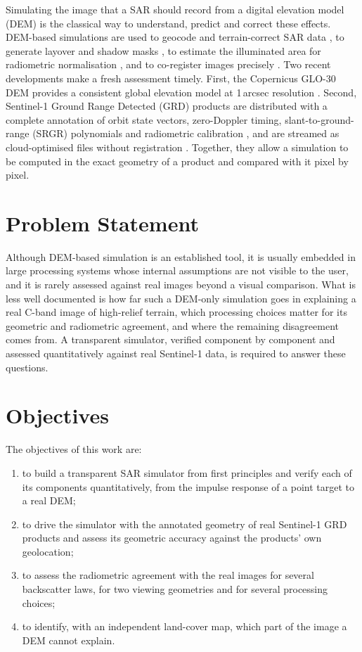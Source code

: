 Simulating the image that a SAR should record from a digital elevation model (DEM) is the classical way to understand,
predict and correct these effects. DEM-based simulations are used to geocode and terrain-correct SAR data
\cite{schreier1993,meier1993,small2011,low2007}, to generate layover and shadow masks \cite{kropatsch1990}, to estimate
the illuminated area for radiometric normalisation \cite{ulander1996,small2011,frey2013}, and to co-register images
precisely \cite{nitti2011}. Two recent developments make a fresh assessment timely. First, the Copernicus GLO-30 DEM
provides a consistent global elevation model at 1\,arcsec resolution \cite{copdem}. Second, Sentinel-1 Ground Range
Detected (GRD) products are distributed with a complete annotation of orbit state vectors, zero-Doppler timing,
slant-to-ground-range (SRGR) polynomials and radiometric calibration \cite{s1pd}, and are streamed as cloud-optimised
files without registration \cite{planetary}. Together, they allow a simulation to be computed in the exact geometry of a
product and compared with it pixel by pixel.

\section{Problem Statement}
Although DEM-based simulation is an established tool, it is usually embedded in large processing systems whose
internal assumptions are not visible to the user, and it is rarely assessed against real images beyond a visual
comparison. What is less well documented is how far such a DEM-only simulation goes in explaining a real C-band image of
high-relief terrain, which processing choices matter for its geometric and radiometric agreement, and where the
remaining disagreement comes from. A transparent simulator, verified component by component and assessed
quantitatively against real Sentinel-1 data, is required to answer these questions.

\section{Objectives}
The objectives of this work are:
\begin{enumerate}
\item to build a transparent SAR simulator from first principles and verify each of its components quantitatively,
from the impulse response of a point target to a real DEM;
\item to drive the simulator with the annotated geometry of real Sentinel-1 GRD products and assess its geometric
accuracy against the products' own geolocation;
\item to assess the radiometric agreement with the real images for several backscatter laws, for two viewing
geometries and for several processing choices;
\item to identify, with an independent land-cover map, which part of the image a DEM cannot explain.
\end{enumerate}

